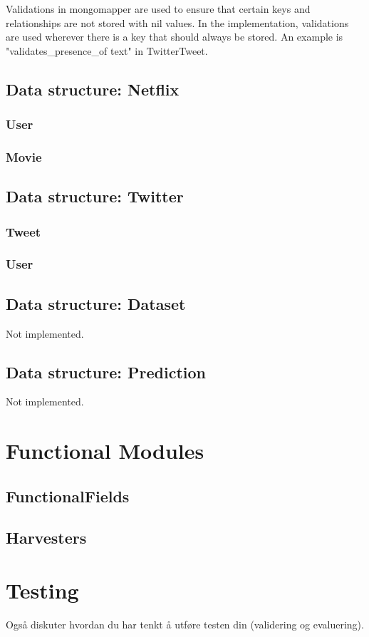 Validations in mongomapper are used to ensure that certain keys and relationships are not stored with nil values. In the implementation, validations are used wherever there is a key that should always be stored. An example is "validates\_presence\_of text" in TwitterTweet.


\subsection{Data structure: Netflix}
\subsubsection{User}
\subsubsection{Movie}

\subsection{Data structure: Twitter}
\subsubsection{Tweet}
\subsubsection{User}

\subsection{Data structure: Dataset}
Not implemented.
\subsection{Data structure: Prediction}
Not implemented.

\section{Functional Modules}\label{impl:Functional Modules}

\subsection{FunctionalFields}
\subsection{Harvesters}

\section{Testing}\label{impl:Testing}
Også diskuter hvordan du har tenkt å utføre testen din (validering og evaluering).
